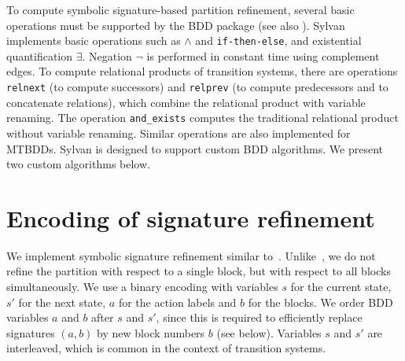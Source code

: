 To compute symbolic signature-based partition refinement, several basic operations must be supported by the BDD package (see also \cite{DBLP:conf/atva/WimmerHHSB06}).
%
%
%
Sylvan implements basic operations such as $\wedge$ and \texttt{if-then-else}, and existential quantification $\exists$.
Negation $\neg$ is performed in constant time using complement edges.
To compute relational products of transition systems, there are operations \texttt{relnext} (to compute successors) and \texttt{relprev} (to compute predecessors and to concatenate relations), which combine the relational product with variable renaming.
The operation \texttt{and\_exists} computes the traditional relational product without variable renaming.
Similar operations are also implemented for MTBDDs.
%
%
%
Sylvan is designed to support custom BDD algorithms.
We present two custom algorithms below.



\section{Encoding of signature refinement}

We implement symbolic signature refinement similar to~\cite{DBLP:conf/atva/WimmerHHSB06}.
%
%
Unlike~\cite{DBLP:conf/atva/WimmerHHSB06}, we do not refine the partition with respect to a single block, but with respect to all blocks simultaneously.
%
%
%
We use a binary encoding with variables $s$ for the current state, $s'$ for the next state, $a$ for the action labels and $b$ for the blocks.
We order BDD variables $a$ and $b$ after $s$ and $s'$, since this is required
to efficiently replace signatures $(a,b)$ by new block numbers $b$ (see below).
Variables $s$ and $s'$ are interleaved, which is common in the context of transition systems.



